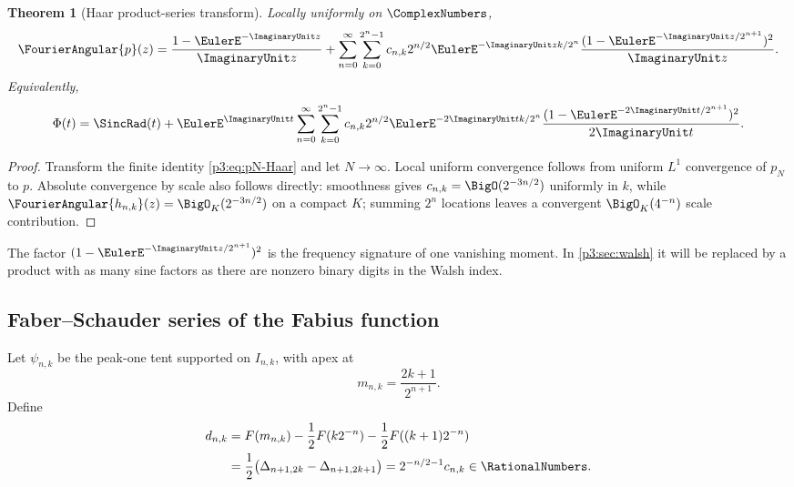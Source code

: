 \documentclass[11pt]{article}
\newtheorem{theorem}{Theorem}[section]
\theoremstyle{definition}
\theoremstyle{remark}
\begin{document}
\begin{theorem}[Haar product-series transform]
\label{p3:thm:Haar-transform-series}
Locally uniformly on $\ComplexNumbers$,
\begin{equation}\label{p3:eq:p-Haar-transform}
 \FourierAngular{p}(z)=\frac{1-\EulerE^{-\ImaginaryUnit z}}{\ImaginaryUnit z}
 +\sum_{n=0}^\infty\sum_{k=0}^{2^n-1}
 c_{n,k}2^{n/2}\EulerE^{-\ImaginaryUnit zk/2^n}
 \frac{(1-\EulerE^{-\ImaginaryUnit z/2^{n+1}})^2}{\ImaginaryUnit z}.
\end{equation}
Equivalently,
\begin{equation}\label{p3:eq:Phi-Haar-transform}
 \Phi(t)=\SincRad(t)
 +\EulerE^{\ImaginaryUnit t}\sum_{n=0}^\infty\sum_{k=0}^{2^n-1}
 c_{n,k}2^{n/2}\EulerE^{-2\ImaginaryUnit tk/2^n}
 \frac{(1-\EulerE^{-2\ImaginaryUnit t/2^{n+1}})^2}{2\ImaginaryUnit t}.
\end{equation}
\end{theorem}

\begin{proof}
Transform the finite identity \eqref{p3:eq:pN-Haar} and let $N\to\infty$.
Local uniform convergence follows from uniform $L^1$ convergence of $p_N$ to
$p$.  Absolute convergence by scale also follows directly: smoothness gives
$c_{n,k}=\BigO(2^{-3n/2})$ uniformly in $k$, while
$\FourierAngular{h_{n,k}}(z)=\BigO_K(2^{-3n/2})$ on a compact $K$; summing $2^n$
locations leaves a convergent $\BigO_K(4^{-n})$ scale contribution.
\end{proof}

The factor $(1-\EulerE^{-\ImaginaryUnit z/2^{n+1}})^2$ is the frequency signature of one
vanishing moment.  In \cref{p3:sec:walsh} it will be replaced by a product with as
many sine factors as there are nonzero binary digits in the Walsh index.

\subsection{Faber--Schauder series of the Fabius function}

Let $\psi_{n,k}$ be the peak-one tent supported on $I_{n,k}$, with apex at
\begin{equation}\label{p3:eq:Schauder-midpoint}
 m_{n,k}=\frac{2k+1}{2^{n+1}}.
\end{equation}
Define
\begin{align}
 d_{n,k}
 &=F(m_{n,k})-\frac12F(k2^{-n})-\frac12F((k+1)2^{-n})
 \label{p3:eq:d-Schauder-def}\\
 &=\frac12\bigl(\Delta_{n+1,2k}-\Delta_{n+1,2k+1}\bigr)
 =2^{-n/2-1}c_{n,k}\in\RationalNumbers.
 \label{p3:eq:d-mass}
\end{align}
\end{document}
